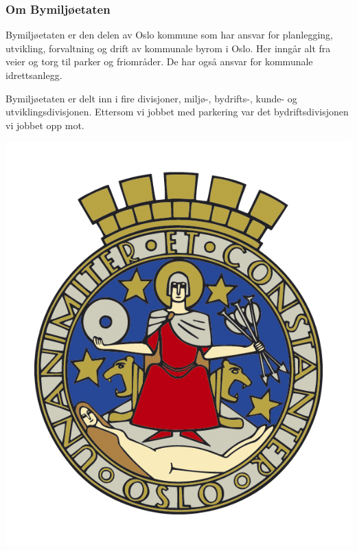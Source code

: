 \documentclass[xetex]{beamer}
\begin{document}
\begin{frame}\label{fr:bymiljoetaten}
	\frametitle{Om Bymiljøetaten}
	Bymiljøetaten er den delen av Oslo kommune som har ansvar for  \alert{planlegging, utvikling, forvaltning og drift} av kommunale byrom i Oslo. Her inngår alt fra veier og torg til parker og friområder. De har også ansvar for kommunale idrettsanlegg.

	Bymiljøetaten er delt inn i fire divisjoner, miljø-, bydrifts-, kunde- og utviklingsdivisjonen. Ettersom vi jobbet med parkering var det bydriftsdivisjonen vi jobbet opp mot.
	
	\vspace{5em}
	\centerline{\includegraphics[scale=0.5]{grafikk/oslo_kommune.jpg}}
\end{frame}
\end{document}
